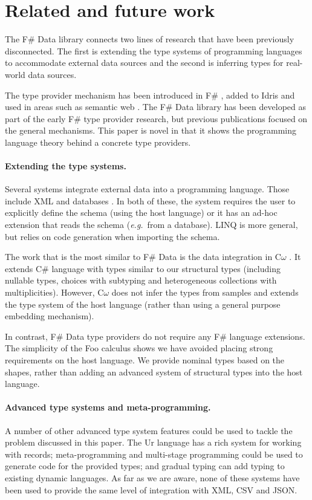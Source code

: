 \documentclass[10pt,nocopyrightspace]{sigplanconf}
\begin{document}
\section{Related and future work}
\label{sec:related}

The F\# Data library connects two lines of research that have been previously disconnected. The first is
extending the type systems of programming languages to accommodate external data sources and the second
is inferring types for real-world data sources.

The type provider mechanism has been introduced in F\# \cite{fsharp-typeprov,fsharp-typeprov-ddfp},
added to Idris  \cite{idris-tp} and used in areas such as semantic web \cite{liteq}. The F\# Data
library has been developed as part of the early F\# type provider research, but previous
publications focused on the general mechanisms. This paper is novel in that it shows the
programming language theory behind a concrete type providers.

\paragraph{Extending the type systems.}
Several systems integrate external data into a programming language. Those include
XML \cite{xduce,xduce-ml} and databases \cite{links}. In both of these, the system requires
the user to explicitly define the schema (using the host language) or it has an ad-hoc extension
that reads the schema (\emph{e.g.}~from a database). LINQ \cite{linq} is more general, but relies
on code generation when importing the schema.

The work that is the most similar to F\# Data is the data integration in C$\omega$ \cite{comega-xs}.
It extends C\# language with types similar to our structural types
(including nullable types, choices with subtyping and heterogeneous collections with multiplicities).
However, C$\omega$ does not infer the types from samples and extends the type system of the host
language (rather than using a general purpose embedding mechanism).

In contrast, F\# Data type providers do not require any F\# language extensions. The simplicity
of the Foo calculus shows we have avoided placing strong requirements on the host language. We
provide nominal types based on the shapes, rather than adding an advanced
system of structural types into the host language.

\paragraph{Advanced type systems and meta-programming.}
A number of other advanced type system features could be used to tackle the problem discussed
in this paper. The Ur \cite{ur} language has a rich system for working with records;
meta-programming \cite{template-hask,th-camlp4} and multi-stage programming \cite{multi-stage}
could be used to generate code for the provided types; and gradual typing \cite{gradual,gradual-js}
can add typing to existing dynamic languages. As far as we are aware, none of these
systems have been used to provide the same level of integration with XML, CSV and JSON.
\end{document}
